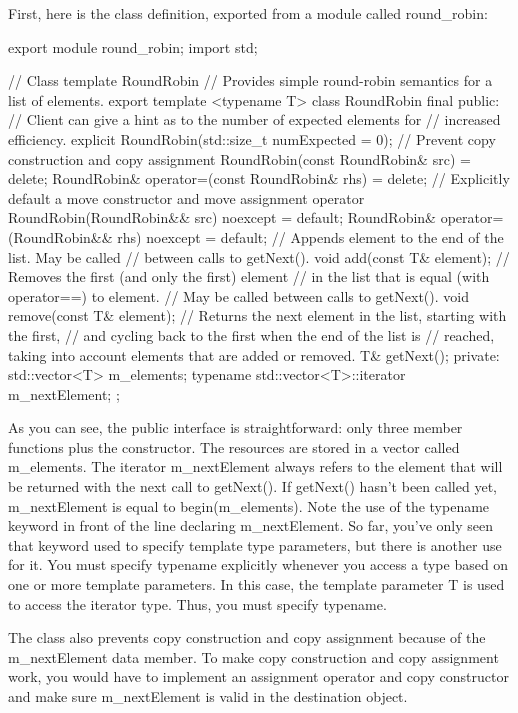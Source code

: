 First, here is the class definition, exported from a module called round\_robin:

\begin{cpp}
export module round_robin;
import std;

// Class template RoundRobin
// Provides simple round-robin semantics for a list of elements.
export template <typename T>
class RoundRobin final
{
    public:
        // Client can give a hint as to the number of expected elements for
        // increased efficiency.
        explicit RoundRobin(std::size_t numExpected = 0);
        // Prevent copy construction and copy assignment
        RoundRobin(const RoundRobin& src) = delete;
        RoundRobin& operator=(const RoundRobin& rhs) = delete;
        // Explicitly default a move constructor and move assignment operator
        RoundRobin(RoundRobin&& src) noexcept = default;
        RoundRobin& operator=(RoundRobin&& rhs) noexcept = default;
        // Appends element to the end of the list. May be called
        // between calls to getNext().
        void add(const T& element);
        // Removes the first (and only the first) element
        // in the list that is equal (with operator==) to element.
        // May be called between calls to getNext().
        void remove(const T& element);
        // Returns the next element in the list, starting with the first,
        // and cycling back to the first when the end of the list is
        // reached, taking into account elements that are added or removed.
        T& getNext();
    private:
        std::vector<T> m_elements;
        typename std::vector<T>::iterator m_nextElement;
};
\end{cpp}

As you can see, the public interface is straightforward: only three member functions plus the constructor. The resources are stored in a vector called m\_elements. The iterator m\_nextElement always refers to the element that will be returned with the next call to getNext(). If getNext() hasn’t been called yet, m\_nextElement is equal to begin(m\_elements). Note the use of the typename keyword in front of the line declaring m\_nextElement. So far, you’ve only seen that keyword used to specify template type parameters, but there is another use for it. You must specify typename explicitly whenever you access a type based on one or more template parameters. In this case, the template parameter T is used to access the iterator type. Thus, you must specify typename.

The class also prevents copy construction and copy assignment because of the m\_nextElement data member. To make copy construction and copy assignment work, you would have to implement an assignment operator and copy constructor and make sure m\_nextElement is valid in the destination object.

